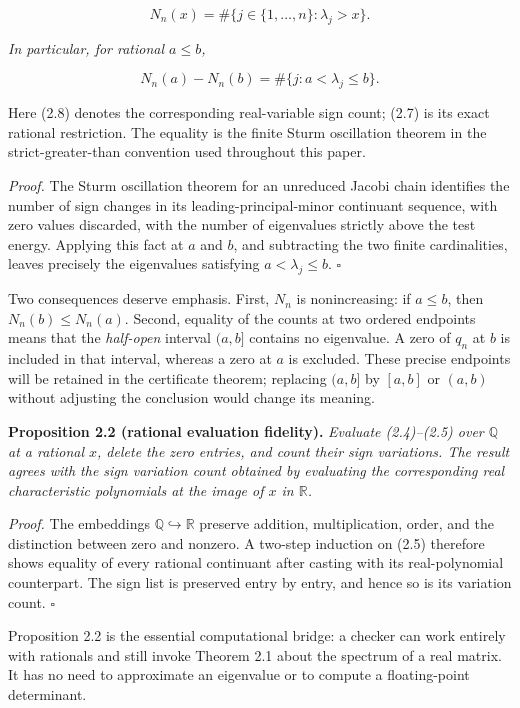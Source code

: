 \documentclass[
  11pt,
]{article}
\begin{document}
\[
N_n(x)=\#\{j\in\{1,\ldots,n\}:\lambda_j>x\}.
\tag{2.8}
\]

\emph{In particular, for rational \(a\le b\),}

\[
N_n(a)-N_n(b)
=\#\{j:a<\lambda_j\le b\}.
\tag{2.9}
\]

Here (2.8) denotes the corresponding real-variable sign count; (2.7) is
its exact rational restriction. The equality is the finite Sturm
oscillation theorem in the strict-greater-than convention used
throughout this paper.

\emph{Proof.} The Sturm oscillation theorem for an unreduced Jacobi
chain identifies the number of sign changes in its
leading-principal-minor continuant sequence, with zero values discarded,
with the number of eigenvalues strictly above the test energy. Applying
this fact at \(a\) and \(b\), and subtracting the two finite
cardinalities, leaves precisely the eigenvalues satisfying
\(a<\lambda_j\le b\). \(\square\)

Two consequences deserve emphasis. First, \(N_n\) is nonincreasing: if
\(a\le b\), then \(N_n(b)\le N_n(a)\). Second, equality of the counts at
two ordered endpoints means that the \emph{half-open} interval \((a,b]\)
contains no eigenvalue. A zero of \(q_n\) at \(b\) is included in that
interval, whereas a zero at \(a\) is excluded. These precise endpoints
will be retained in the certificate theorem; replacing \((a,b]\) by
\([a,b]\) or \((a,b)\) without adjusting the conclusion would change its
meaning.

\textbf{Proposition 2.2 (rational evaluation fidelity).} \emph{Evaluate
(2.4)--(2.5) over \(\mathbb Q\) at a rational \(x\), delete the zero
entries, and count their sign variations. The result agrees with the
sign variation count obtained by evaluating the corresponding real
characteristic polynomials at the image of \(x\) in \(\mathbb R\).}

\emph{Proof.} The embeddings \(\mathbb Q\hookrightarrow\mathbb R\)
preserve addition, multiplication, order, and the distinction between
zero and nonzero. A two-step induction on (2.5) therefore shows equality
of every rational continuant after casting with its real-polynomial
counterpart. The sign list is preserved entry by entry, and hence so is
its variation count. \(\square\)

Proposition 2.2 is the essential computational bridge: a checker can
work entirely with rationals and still invoke Theorem 2.1 about the
spectrum of a real matrix. It has no need to approximate an eigenvalue
or to compute a floating-point determinant.
\end{document}
